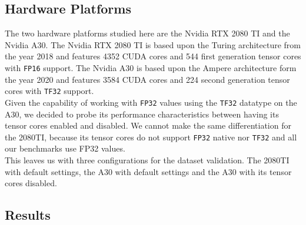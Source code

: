 
\subsection{Hardware Platforms}
The two hardware platforms studied here are the Nvidia RTX 2080 TI and the Nvidia A30. The Nvidia RTX 2080 TI is based upon the Turing architecture from the year 2018 and features 4352 CUDA cores and 544 first generation tensor cores with \texttt{FP16} support. The Nvidia A30 is based upon the Ampere architecture form the year 2020 and features 3584 CUDA cores and 224 second generation tensor cores with \texttt{TF32} support.\\
Given the capability of working with \texttt{FP32} values using the \texttt{TF32} datatype on the A30, we decided to probe its performance characteristics between having its tensor cores enabled and disabled. We cannot make the same differentiation for the 2080TI, because its tensor cores do not support \texttt{FP32} native nor \texttt{TF32} and all our benchmarks use FP32 values. \\
This leaves us with three configurations for the dataset validation. The 2080TI with default settings, the A30 with default settings and the A30 with its tensor cores disabled.


\subsection{Results}

